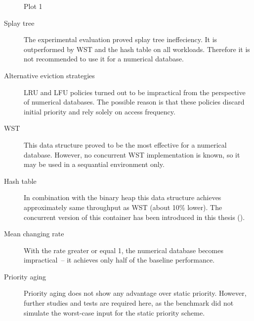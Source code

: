 \begin{figure}
\centering
\caption{Plot 1}
\end{figure}

\begin{description}
\item[Splay tree]The experimental evaluation proved splay tree ineffeciency. It is outperformed by WST and the hash table on all workloads. Therefore it is not recommended to use it for a numerical database.
\item[Alternative eviction strategies] LRU and LFU policies turned out to be impractical from the perspective of numerical databases. The possible reason is that these policies discard initial priority and rely solely on access frequency.
\item[WST] This data structure proved to be the most effective for a numerical database. However, no concurrent WST implementation is known, so it may be used in a sequantial environment only.
\item[Hash table] In combination with the binary heap this data structure achieves approximately same throughput as WST (about 10\% lower). The concurrent version of this container has been introduced in this thesis ().
\item[Mean changing rate] With the rate greater or equal 1, the numerical database becomes impractical~-- it achieves only half of the baseline performance.
\item[Priority aging] Priority aging does not show any advantage over static priority. However, further studies and tests are required here, as the benchmark did not simulate the worst-case input for the static priority scheme.
\end{description}
